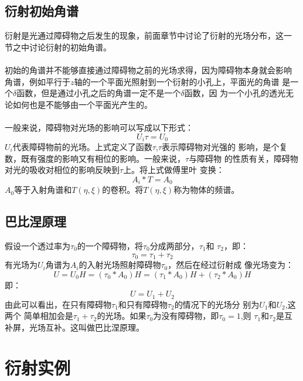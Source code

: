 \documentclass{article}
\begin{document}
\subsection{衍射初始角谱}
衍射是光通过障碍物之后发生的现象，前面章节中讨论了衍射的光场分布，这一
节之中讨论衍射的初始角谱。
\paragraph{}
初始的角谱并不能够直接通过障碍物之前的光场求得，因为障碍物本身就会影响
角谱，例如平行于$z$轴的一个平面光照射到一个衍射的小孔上，平面光的角谱
是一个$\delta$函数，但是通过小孔之后的角谱一定不是一个$\delta$函数，因
为一个小孔的透光无论如何也是不能够由一个平面光产生的。
\paragraph{}
一般来说，障碍物对光场的影响可以写成以下形式：
\[U_i\tau=U_0 \]
$U_i$代表障碍物前的光场。上式定义了函数$\tau$,$\tau$表示障碍物对光强的
影响，是个复数，既有强度的影响又有相位的影响。一般来说，$\tau$与障碍物
的性质有关，障碍物对光的吸收对相位的影响反映到$\tau$上。将上式做傅里叶
变换：
\[A_i*T=A_0\]
$A_0$等于入射角谱和$T(\eta,\xi)$的卷积。将$T(\eta,\xi)$称为物体的频谱。
\subsection{巴比涅原理}
假设一个透过率为$\tau_0$的一个障碍物，将$\tau_0$分成两部分，$\tau_1$和
$\tau_2$，即：
\[\tau_0=\tau_1+\tau_2\]
有光场为$U_i$角谱为$A_i$的入射光场照射障碍物$\tau_0$，然后在经过衍射成
像光场变为：
\[U=U_0H=(\tau_0*A_0)H=(\tau_1*A_0)H+(\tau_2*A_0)H\]
即：
\[U=U_1+U_2\]
由此可以看出，在只有障碍物$\tau_1$和只有障碍物$\tau_2$的情况下的光场分
别为$U_1$和$U_2$,这两个
简单相加会是$\tau_1+\tau_2$的光场。如果$\tau_0$为没有障碍物，即$\tau_0=1$,则
$\tau_1$和$\tau_2$是互补屏，光场互补。这叫做巴比涅原理。
\section{衍射实例}
\end{document}
